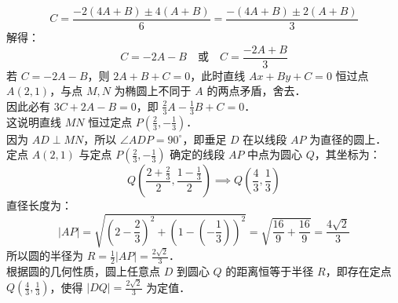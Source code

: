 {\begin{proof*}
\[
C = \frac{-2(4A+B) \pm 4(A+B)}{6} = \frac{-(4A+B) \pm 2(A+B)}{3}
\]
解得：
\[
C = -2A - B \quad \text{或} \quad C = \frac{-2A+B}{3}
\]
若 $C = -2A - B$，则 $2A + B + C = 0$，此时直线 $Ax+By+C=0$ 恒过点 $A(2, 1)$，与点 $M, N$ 为椭圆上不同于 $A$ 的两点矛盾，舍去．\\
因此必有 $3C + 2A - B = 0$，即 $\frac{2}{3}A - \frac{1}{3}B + C = 0$．\\
这说明直线 $MN$ 恒过定点 $P(\frac{2}{3}, -\frac{1}{3})$．\\
因为 $AD \perp MN$，所以 $\angle ADP = 90^\circ$，即垂足 $D$ 在以线段 $AP$ 为直径的圆上．\\
定点 $A(2, 1)$ 与定点 $P(\frac{2}{3}, -\frac{1}{3})$ 确定的线段 $AP$ 中点为圆心 $Q$，其坐标为：
\[
Q\left(\frac{2 + \frac{2}{3}}{2}, \frac{1 - \frac{1}{3}}{2}\right) \implies Q\left(\frac{4}{3}, \frac{1}{3}\right)
\]
直径长度为：
\[
|AP| = \sqrt{\left(2 - \frac{2}{3}\right)^2 + \left(1 - \left(-\frac{1}{3}\right)\right)^2} = \sqrt{\frac{16}{9} + \frac{16}{9}} = \frac{4\sqrt{2}}{3}
\]
所以圆的半径为 $R = \frac{1}{2}|AP| = \frac{2\sqrt{2}}{3}$．\\
根据圆的几何性质，圆上任意点 $D$ 到圆心 $Q$ 的距离恒等于半径 $R$，即存在定点 $Q\left(\frac{4}{3}, \frac{1}{3}\right)$，使得 $|DQ| = \frac{2\sqrt{2}}{3}$ 为定值．
\end{proof*}
}
\newcommand{\qConicHardNewGaokaoDiagnosis}{
\errortag{硬解一般式直接化简} 本题如果采用常规纵截式 $y=kx+m$ 联立，由于 $A(2,1)$ 坐标非零，式子中会包含极其杂乱的交叉项、一次项和常数项，代数通分计算量呈指数级增长，极易算错。若采用硬解一般式直线 $Ax+By+C=0$，直接代入四个基本韦达对称量，能够瞬间将问题转化为 $A, B, C$ 的二次齐次式。关键在于利用判别式 $\Delta_C = 16(A+B)^2$ 是完全平方式，将二次式分解为两个一次因式，从而锁定直线过定点。这一代数推导过程简洁严密，完美体现了硬解定理统摄一般式直线的计算优势．\\
\errortag{几何直角转化为圆} 第 (2) 问中求 $|DQ|$ 的定值，如果直接写出 $D$ 的坐标并用两点距离公式硬算，会由于 $D$ 在动直线上而导致极度复杂的根式计算。通过发现 $\angle ADP = 90^\circ$ 并转化为“直角所对的弦为圆直径”，将 $D$ 的轨迹锁定为定圆，从而使 $|DQ|$ 直接转化为圆的半径，无需进行任何复杂的代数运算。
}

